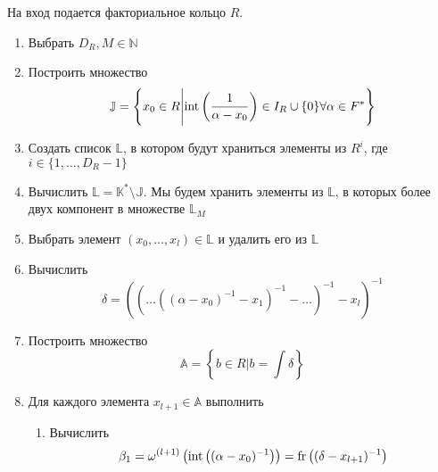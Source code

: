 \documentclass[_00_autoref.tex]{subfiles}
\begin{document}
\begin{algorithm}\label{algorithm:R_in_T}
    На вход подается факториальное кольцо $R$.
    
    \begin{enumerate}
        \item Выбрать $D_R, M \in \mathbb{N}$
        
        \item Построить множество
        \begin{equation*}
            \mathbb{J} = \left\{
                x_0 \in R \Bigg| \textrm{int}\left(\frac{1}{\alpha-x_0}\right) \in I_{R} \cup \{0\} \forall \alpha \in F^{*}
            \right\}
        \end{equation*}
        
        \item Создать список $\mathbb{L}$, в котором будут храниться элементы из $R^i$, где $i \in \{1, \ldots, D_R - 1\}$

        \item Вычислить $\mathbb{L}=\mathbb{K}^*\setminus\mathbb{J}$. Мы будем хранить элементы из $\mathbb{L}$, в которых более двух компонент в множестве $\mathbb{L}_M$

        \item\label{step:every_element_in_L} Выбрать элемент $(x_0, \ldots, x_l) \in \mathbb{L}$ и удалить его из $\mathbb{L}$

        \item Вычислить
        \begin{equation*}
            \delta = \left(
                \left(
                    \ldots\left(
                        \left(
                            \alpha - x_0
                        \right)^{-1} - x_1
                    \right)^{-1} - \ldots
                \right)^{-1} - x_l
            \right)^{-1}
        \end{equation*}

        \item Построить множество
        \begin{equation*}
            \mathbb{A} = \left\{
                b \in R \big| b = \int{\delta}
            \right\}
        \end{equation*}

        \item\label{step:every_element_in_A} Для каждого элемента $x_{l+1} \in \mathbb{A}$ выполнить
        \begin{enumerate}
            \item Вычислить
            \begin{equation*}
                \beta_1 = \omega^{(l+1)} \left(
                    \textrm{int}\left((\alpha-x_0)^{-1}\right)
                \right) = \textrm{fr}\left((\delta-x_{l+1})^{-1}\right)
            \end{equation*}


\end{enumerate}
\end{enumerate}
\end{algorithm}
\end{document}
